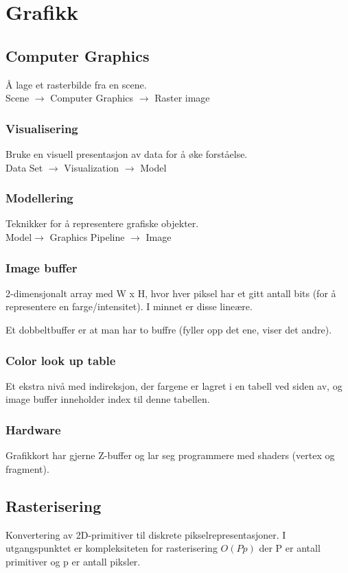 \section{Grafikk}

\subsection{Computer Graphics}
Å lage et rasterbilde fra en scene. \\
Scene $\rightarrow$ Computer Graphics $\rightarrow$ Raster image

\subsubsection{Visualisering}
Bruke en visuell presentasjon av data for å øke forståelse. \\
Data Set $\rightarrow$ Visualization $\rightarrow$ Model 

\subsubsection{Modellering}
Teknikker for å representere grafiske objekter.\\
Model$\rightarrow$ Graphics Pipeline $\rightarrow$ Image

\subsubsection{Image buffer}
2-dimensjonalt array med W x H, hvor hver piksel har et gitt antall bits (for å representere en farge/intensitet). I minnet er disse lineære.

Et dobbeltbuffer er at man har to buffre (fyller opp det ene, viser det andre).

\subsubsection{Color look up table}
Et ekstra nivå med indireksjon, der fargene er lagret i en tabell ved siden av, og image buffer inneholder index til denne tabellen.

\subsubsection{Hardware}
Grafikkort har gjerne Z-buffer og lar seg programmere med shaders (vertex og fragment).

\subsection{Rasterisering}
Konvertering av 2D-primitiver til diskrete pikselrepresentasjoner. I utgangspunktet er kompleksiteten for rasterisering $O(Pp)$ der P er antall primitiver og p er antall piksler.

